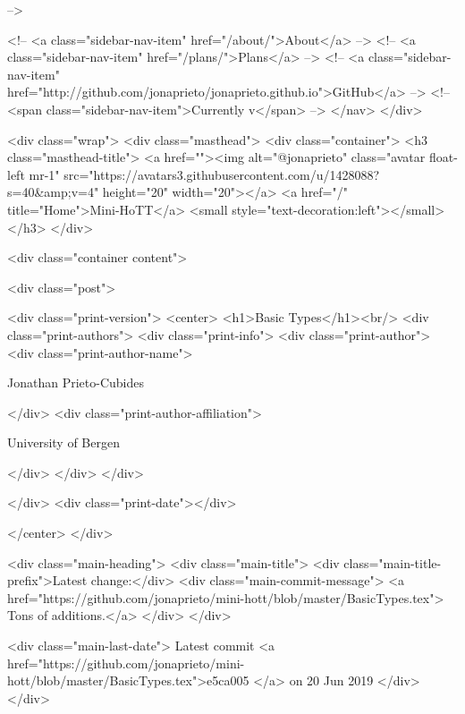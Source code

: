       
     -->

    <!-- <a class="sidebar-nav-item" href="/about/">About</a> -->
    <!-- <a class="sidebar-nav-item" href="/plans/">Plans</a> -->
    <!-- <a class="sidebar-nav-item" href="http://github.com/jonaprieto/jonaprieto.github.io">GitHub</a> -->
    <!-- <span class="sidebar-nav-item">Currently v</span> -->
  </nav>
</div>

    <div class="wrap">
      <div class="masthead">
        <div class="container">
          <h3 class="masthead-title">
            <a href=""><img alt="@jonaprieto" class="avatar float-left mr-1" src="https://avatars3.githubusercontent.com/u/1428088?s=40&amp;v=4" height="20" width="20"></a>
            <a href="/" title="Home">Mini-HoTT</a>
            <small style="text-decoration:left"></small>
          </h3>
        </div>
      
      <div class="container content">
        







<div class="post">

  <div class="print-version">
    <center>
      <h1>Basic Types</h1><br/>
        <div class="print-authors">
          <div class="print-info">
            <div class="print-author">
              <div class="print-author-name">
                
                  Jonathan Prieto-Cubides
                
              </div>
              <div class="print-author-affiliation">
                
                  University of Bergen
                
                </div>
            </div>
          </div>
          
          
        </div>
        <div class="print-date"></div>
        
        
    </center>
  </div>

  
  <div class="main-heading">
    <div class="main-title">
      <div class="main-title-prefix">Latest change:</div>
      <div class="main-commit-message">
            <a href="https://github.com/jonaprieto/mini-hott/blob/master/BasicTypes.tex">
              Tons of additions.</a>
      </div>
    </div>

    <div class="main-last-date">
      Latest commit <a href="https://github.com/jonaprieto/mini-hott/blob/master/BasicTypes.tex">e5ca005 </a> on  20 Jun 2019
    </div>
  </div>
  
